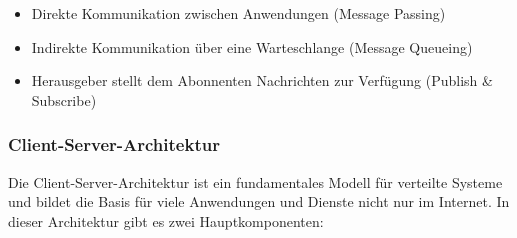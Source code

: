 \documentclass[../vs-script-first-v01.tex]{subfiles}
\begin{document}
\begin{itemize}
\item Direkte Kommunikation zwischen Anwendungen (Message Passing)
\item Indirekte Kommunikation über eine Warteschlange (Message Queueing)
\item Herausgeber stellt dem Abonnenten Nachrichten zur Verfügung (Publish \& Subscribe)
\end{itemize}

\subsubsection{Client-Server-Architektur}
Die Client-Server-Architektur ist ein fundamentales Modell für verteilte Systeme und bildet die Basis für viele Anwendungen und Dienste nicht nur im Internet. In dieser Architektur gibt es zwei Hauptkomponenten:
\end{document}
